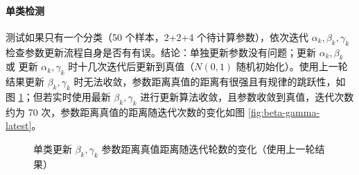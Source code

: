 \documentclass[12pt, a4paper, oneside]{article}
\numberwithin{equation}{section}
\begin{document}
\paragraph{单类检测}

测试如果只有一个分类（50 个样本，2+2+4 个待计算参数），依次迭代 $\alpha_k, \beta_k, \gamma_k$ 检查参数更新流程自身是否有有误。结论：单独更新参数没有问题；更新 $\alpha_k, \beta_k$ 或 更新 $\alpha_k, \gamma_k$ 时十几次迭代后更新到真值（$N(0,1)$ 随机初始化）。使用上一轮结果更新 $\beta_k, \gamma_k$ 时无法收敛，参数距离真值的距离有很强且有规律的跳跃性，如图 \ref{fig:beta-gamma-jump}；但若实时使用最新 $\beta_k, \gamma_k$ 进行更新算法收敛，且参数收敛到真值，迭代次数约为 70 次，参数距离真值的距离随迭代次数的变化如图 \ref{fig:beta-gamma-latest}。

\begin{figure}
	\centering
	\caption{单类更新 $\beta_k, \gamma_k$ 参数距离真值距离随迭代轮数的变化（使用上一轮结果）}
	\label{fig:beta-gamma-jump}
\end{figure}
\end{document}
